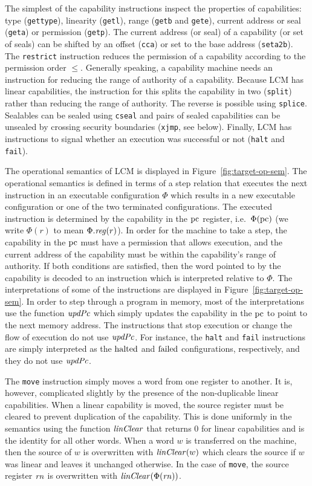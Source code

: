 \documentclass[acmsmall,screen]{acmart}\settopmatter{}
\renewcommand{\updPcAddr}[1]{\plainfun{updPc}{#1}}
\renewcommand{\linCons}[1]{\plainfun{linClear}{#1}}
\newcommand{\trgcm}{\textsc{LCM}}
\begin{document}
The simplest of the capability instructions inspect the properties of capabilities: type (\texttt{gettype}), linearity (\texttt{getl}), range (\texttt{getb} and \texttt{gete}), current address or seal (\texttt{geta}) or permission (\texttt{getp}).
The current address (or seal) of a capability (or set of seals) can be shifted by an offset (\texttt{cca}) or set to the base address (\texttt{seta2b}).
The \texttt{restrict} instruction reduces the permission of a capability according to the permission order $\le$.
Generally speaking, a capability machine needs an instruction for reducing the range of authority of a capability.
Because \trgcm{} has linear capabilities, the instruction for this splits the capability in two (\texttt{split}) rather than reducing the range of authority.
The reverse is possible using \texttt{splice}.
Sealables can be sealed using \texttt{cseal} and pairs of sealed capabilities can be unsealed by crossing security boundaries (\texttt{xjmp}, see below).
Finally, \trgcm{} has instructions to signal whether an execution was successful or not (\texttt{halt} and \texttt{fail}).

The operational semantics of \trgcm{} is displayed in Figure~\ref{fig:target-op-sem}.
The operational semantics is defined in terms of a step relation that executes the next instruction in an executable configuration $\Phi$ which results in a new executable configuration or one of the two terminated configurations.
The executed instruction is determined by the capability in the $\mathrm{pc}$ register, i.e.\ $\Phi(\mathrm{pc})$ (we write $\Phi(r)$ to mean $\Phi.\reg(r)$).
In order for the machine to take a step, the capability in the $\mathrm{pc}$ must have a permission that allows execution, and the current address of the capability must be within the capability's range of authority.
If both conditions are satisfied, then the word pointed to by the capability is decoded to an instruction which is interpreted relative to $\Phi$.
The interpretations of some of the instructions are displayed in Figure~\ref{fig:target-op-sem}.
In order to step through a program in memory, most of the interpretations use the function $\updPcAddr{}$ which simply updates the capability in the $\mathrm{pc}$ to point to the next memory address.
The instructions that stop execution or change the flow of execution do not use $\updPcAddr{}$.
For instance, the \texttt{halt} and \texttt{fail} instructions are simply interpreted as the $\mathrm{halted}$ and $\mathrm{failed}$ configurations, respectively, and they do not use $\updPcAddr{}$.

The \texttt{move} instruction simply moves a word from one register to another.
It is, however, complicated slightly by the presence of the non-duplicable linear capabilities.
When a linear capability is moved, the source register must be cleared to prevent duplication of the capability.
This is done uniformly in the semantics using the function $\linCons{}$ that returns $0$ for linear capabilities and is the identity for all other words.
When a word $w$ is transferred on the machine, then the source of $w$ is overwritten with $\linCons{w}$ which clears the source if $w$ was linear and leaves it unchanged otherwise.
In the case of \texttt{move}, the source register $\mathit{rn}$ is overwritten with $\linCons{\Phi(\rn)}$.
\end{document}
